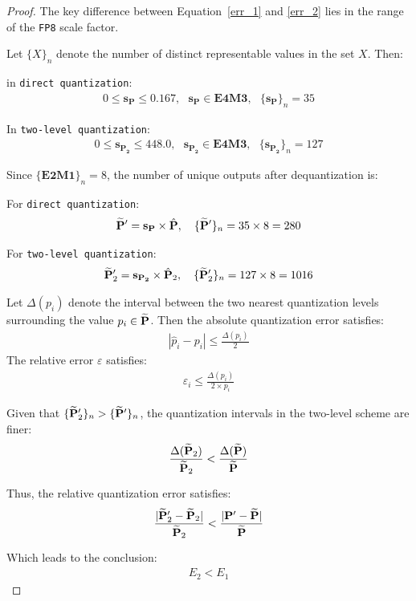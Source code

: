 \begin{proof}
The key difference between Equation~\ref{err_1} and \ref{err_2} lies in the range of the \texttt{FP8} scale factor.

Let $\{X\}_n$ denote the number of distinct representable values in the set $X$. Then:

in \texttt{direct quantization}:
\begin{align*}
    0 \le \mathbf{s_{P}} \le 0.167,~~~ \mathbf{s_{P}} \in \mathbf{E4M3}, ~~~ \{\mathbf{s_{P}}\}_n = 35
\end{align*}

In \texttt{two-level quantization}:
\begin{align*}
    0 \le \mathbf{s_{P_2}} \le 448.0, ~~~ \mathbf{s_{P_2}} \in \mathbf{E4M3}, ~~~ \{\mathbf{s_{P_2}}\}_n = 127
\end{align*}

Since $\{\textbf{E2M1}\}_n = 8$, the number of unique outputs after dequantization is:

For \texttt{direct quantization}:
\begin{align*}
    \widetilde {\mathbf{P}}^{\prime} = \mathbf{s_{P}} \times \hat {\mathbf{P}}, ~~~ \{\widetilde {\mathbf{P}}^{\prime} \}_n = 35 \times 8 = 280
\end{align*}

For \texttt{two-level quantization}:
\begin{align*}
    \widetilde {\mathbf{P}}_{2}^{\prime} = \mathbf{s_{P_2}} \times \hat {\mathbf{P}}_2, ~~~ \{\widetilde {\mathbf{P}}_2^{\prime} \}_n = 127 \times 8 = 1016
\end{align*}

Let $\Delta(p_i)$ denote the interval between the two nearest quantization levels surrounding the value $p_i \in \widetilde {\mathbf{P}}$.
Then the absolute quantization error satisfies:
\begin{align*}
|\hat p_i - p_i| \le \frac{\Delta(p_i)}{2}
\end{align*}
The relative error $\varepsilon$ satisfies:
\begin{align*}
   \varepsilon_i \le \frac{\Delta(p_i)}{2 \times p_i}
\end{align*}

Given that $\{\widetilde {\mathbf{P}}_2^{\prime} \}_n > \{\widetilde {\mathbf{P}}^{\prime} \}_n$, the quantization intervals in the two-level scheme are finer:
\begin{align*}
\frac{\Delta(\widetilde {\mathbf{P}}_2)}{\widetilde {\mathbf{P}}_2} < \frac{\Delta(\widetilde {\mathbf{P}})}{\widetilde {\mathbf{P}}}
\end{align*}

Thus, the relative quantization error satisfies:
\begin{align*}
\frac{|\widetilde {\mathbf{P}}_2^{\prime} - \widetilde {\mathbf{P}}_2|}{\widetilde {\mathbf{P}}_2} <  \frac{|\mathbf{P}^{\prime} - \widetilde {\mathbf{P}}|}{\widetilde {\mathbf{P}}} 
\end{align*}

Which leads to the conclusion:
\begin{align*}
    E_2 < E_1
\end{align*}

\end{proof}


